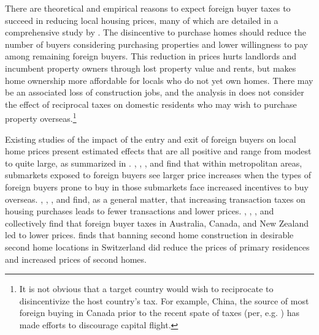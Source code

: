 \documentclass[12pt]{article}
\begin{document}
There are theoretical and empirical reasons to expect foreign buyer taxes to
succeed in reducing local housing prices, many of which are detailed in a
comprehensive study by \textcite{favilukisVanNieuwerburgh}. The disincentive to
purchase homes should reduce the number of buyers considering purchasing
properties and lower willingness to pay among remaining foreign buyers. This
reduction in prices hurts landlords and incumbent property owners through lost
property value and rents, but makes home ownership more affordable for locals
who do not yet own homes. There may be an associated loss of construction jobs,
and the analysis in \textcite{favilukisVanNieuwerburgh} does not consider the
effect of reciprocal taxes on domestic residents who may wish to purchase
property overseas.\footnote{It is not obvious that a target country would wish
	to reciprocate to disincentivize the host country's tax. For example,
	China, the source of most foreign buying in Canada prior to the recent
spate of taxes (per, e.g. \textcite{ctvNews}) has made efforts to discourage capital
flight.}

Existing studies of the impact of the entry and exit of foreign buyers on local home prices
present estimated effects that are all positive and range from modest to quite
large, as summarized in \textcite{davidoffZheng}. \textcite{LiShenZhang},
\textcite{gorbackGlobalCapitalLocal2020},
\textcite{pavlovImmigrationCapitalFlows2018}, and \textcite{BadarinzaRamadorai}
find that within metropolitan areas, submarkets exposed to foreign buyers see
larger price increases when the types of foreign buyers prone to buy in those
submarkets face increased incentives to buy overseas.
\textcite{DachisDurantonTurner}, \textcite{klevenBest},
\textcite{kopczukMunroe}, and \textcite{davidoffLeigh} find, as a general
matter, that increasing transaction taxes on housing purchases leads to fewer
transactions and lower prices. \textcite{HartleyForeign},
\textcite{andolfatto2024foreignbuyers}, \textcite{DuYinZhang}, and
\textcite{pavlovForeignBuyerTaxes} collectively find that foreign buyer taxes
in Australia, Canada, and New Zealand led to lower prices.
\textcite{hilber2020secondhomes} finds that banning second home construction in
desirable second home locations in Switzerland did reduce the prices of primary
residences and increased prices of second homes.
\end{document}
